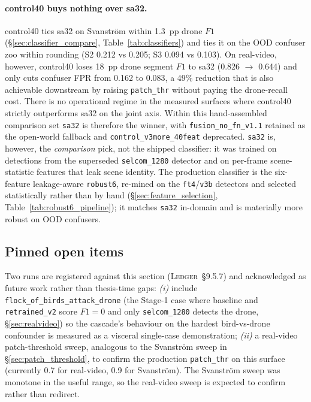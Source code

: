 \documentclass[12pt,a4paper,oneside,openright]{book}
\begin{document}
\paragraph{control40 buys nothing over sa32.}
control40 ties sa32 on Svanstr\"om within 1.3~pp drone $F1$ (\S\ref{sec:classifier_compare}, Table~\ref{tab:classifiers}) and ties it on the OOD confuser zoo within rounding (S2 0.212 vs 0.205; S3 0.094 vs 0.103). On real-video, however, control40 loses 18~pp drone segment $F1$ to sa32 (0.826 $\to$ 0.644) and only cuts confuser FPR from 0.162 to 0.083, a 49\% reduction that is also achievable downstream by raising \texttt{patch\_thr} without paying the drone-recall cost. There is no operational regime in the measured surfaces where control40 strictly outperforms sa32 on the joint axis. Within this hand-assembled comparison set \texttt{sa32} is therefore the winner, with \texttt{fusion\_no\_fn\_v1.1} retained as the open-world fallback and \texttt{control\_v3more\_40feat} deprecated. \texttt{sa32} is, however, the \emph{comparison} pick, not the shipped classifier: it was trained on detections from the superseded \texttt{selcom\_1280} detector and on per-frame scene-statistic features that leak scene identity. The production classifier is the six-feature leakage-aware \texttt{robust6}, re-mined on the \texttt{ft4}/\texttt{v3b} detectors and selected statistically rather than by hand (\S\ref{sec:feature_selection}, Table~\ref{tab:robust6_pipeline}); it matches \texttt{sa32} in-domain and is materially more robust on OOD confusers.

\subsection{Pinned open items}
Two runs are registered against this section (\textsc{Ledger}~\S9.5.7) and acknowledged as future work rather than thesis-time gaps:
\emph{(i)} include \texttt{flock\_of\_birds\_attack\_drone} (the Stage-1 case where baseline and \texttt{retrained\_v2} score $F1=0$ and only \texttt{selcom\_1280} detects the drone, \S\ref{sec:realvideo}) so the cascade's behaviour on the hardest bird-vs-drone confounder is measured as a visceral single-case demonstration; \emph{(ii)} a real-video patch-threshold sweep, analogous to the Svanstr\"om sweep in \S\ref{sec:patch_threshold}, to confirm the production \texttt{patch\_thr} on this surface (currently 0.7 for real-video, 0.9 for Svanstr\"om). The Svanstr\"om sweep was monotone in the useful range, so the real-video sweep is expected to confirm rather than redirect.
\end{document}
